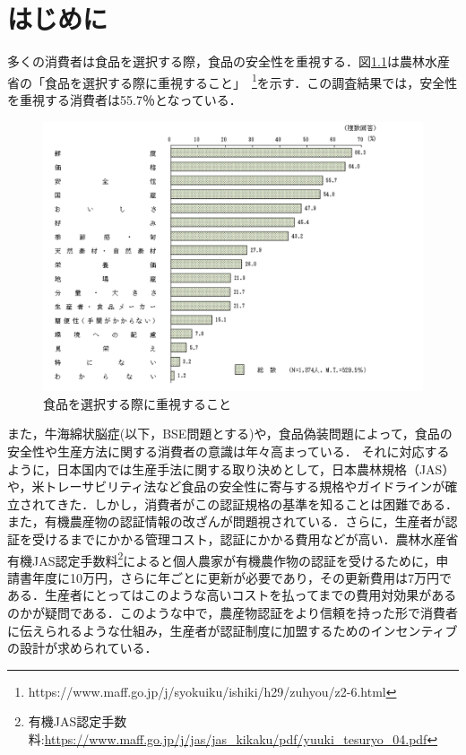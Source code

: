 \documentclass[11pt,dvipdfmx]{jreport}
\begin{document}
\chapter{はじめに}
多くの消費者は食品を選択する際，食品の安全性を重視する．図\ref{fig:zyuusi}は農林水産省の「食品を選択する際に重視すること」~\footnote[1]{https://www.maff.go.jp/j/syokuiku/ishiki/h29/zuhyou/z2-6.html}を示す．この調査結果では，安全性を重視する消費者は55.7％となっている．
\begin{figure}[t]
	\includegraphics[width=1.0\linewidth]{Haraguchi_fig/syouhisyaanke-to.pdf}
	\caption{食品を選択する際に重視すること\protect\footnotemark[1]}
	\label{fig:zyuusi}
\end{figure}
また，牛海綿状脳症(以下，BSE問題とする)や，食品偽装問題によって，食品の安全性や生産方法に関する消費者の意識は年々高まっている．
それに対応するように，日本国内では生産手法に関する取り決めとして，日本農林規格（JAS）や，米トレーサビリティ法など食品の安全性に寄与する規格やガイドラインが確立されてきた．しかし，消費者がこの認証規格の基準を知ることは困難である．また，有機農産物の認証情報の改ざんが問題視されている．さらに，生産者が認証を受けるまでにかかる管理コスト，認証にかかる費用などが高い．農林水産省有機JAS認定手数料\footnote{有機JAS認定手数料:\url{https://www.maff.go.jp/j/jas/jas_kikaku/pdf/yuuki_tesuryo_04.pdf}}によると個人農家が有機農作物の認証を受けるために，申請書年度に10万円，さらに年ごとに更新が必要であり，その更新費用は7万円である．生産者にとってはこのような高いコストを払ってまでの費用対効果があるのかが疑問である．このような中で，農産物認証をより信頼を持った形で消費者に伝えられるような仕組み，生産者が認証制度に加盟するためのインセンティブの設計が求められている．
\end{document}
